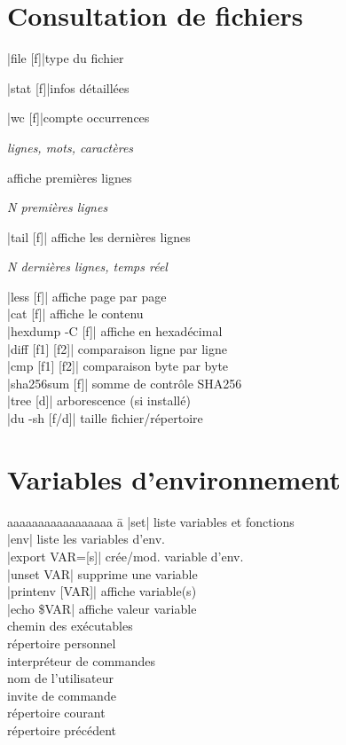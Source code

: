 \documentclass{article}
\newenvironment{cmdblock}{%
  \par\setlength{\parindent}{0pt}\setlength{\parskip}{0pt}%
  \RaggedRight%
}{\par}
\newlength{\cmdoptindent}
\newcommand{\cmdopt}[1]{%
  \hspace*{\cmdoptindent}%
  \begin{minipage}[t]{\dimexpr\linewidth-\cmdoptindent\relax}
    \RaggedRight \itshape #1%
  \end{minipage}\par
}
\begin{document}
\begin{multicols}{4}
    \section*{Consultation de fichiers}
    \begin{cmdblock}
        \code|file [f]|\quad type du fichier\par
        \code|stat [f]|\quad infos détaillées\par
        \code|wc [f]|\quad compte occurrences\par
        \cmdopt{ lignes,  mots,  caractères}
        \quad affiche premières lignes\par
        \cmdopt{ N premières lignes}
        \code|tail [f]| \quad affiche les dernières lignes \\
        \cmdopt{ N dernières lignes,
             temps réel}
        \code|less [f]| \quad affiche page par page \\
        \code|cat [f]| \quad affiche le contenu \\
        \code|hexdump -C [f]| \quad affiche en hexadécimal \\
        \code|diff [f1] [f2]| \quad comparaison ligne par ligne \\
        \code|cmp [f1] [f2]| \quad comparaison byte par byte \\
        \code|sha256sum [f]| \quad somme de contrôle SHA256 \\
        \code|tree [d]| \quad arborescence (si installé) \\
        \code|du -sh [f/d]| \quad taille fichier/répertoire
    \end{cmdblock}

    \section*{Variables d'environnement}
    \begin{tabbing}
        aaaaaaaaaaaaaaaaa \= a \kill
        \code|set| \> liste variables et fonctions \\
        \code|env| \> liste les variables d'env. \\
        \code|export VAR=[s]| \> crée/mod. variable d'env. \\
        \code|unset VAR| \> supprime une variable \\
        \code|printenv [VAR]| \> affiche variable(s) \\
        \code|echo \$VAR| \> affiche valeur variable \\
         \> chemin des exécutables \\
         \> répertoire personnel \\
         \> interpréteur de commandes \\
         \> nom de l'utilisateur \\
         \> invite de commande \\
         \> répertoire courant \\
         \> répertoire précédent
    \end{tabbing}


\end{multicols}
\end{document}

